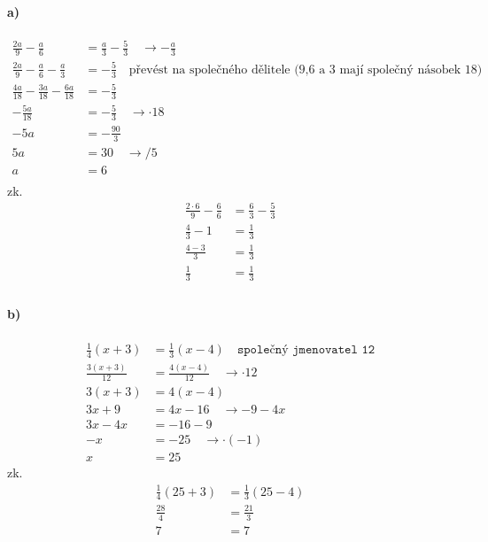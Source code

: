 \documentclass[12pt]{article}
\begin{document}
\paragraph{a)}
\begin{equation}
\begin{split}
\nonumber
\frac{2a}{9}-\frac{a}{6}&=\frac{a}{3}-\frac{5}{3}\quad \rightarrow -\frac{a}{3}\\
\frac{2a}{9}-\frac{a}{6}-\frac{a}{3}&=-\frac{5}{3}\quad \text{převést na společného dělitele (9,6 a 3 mají společný násobek 18)}\\
\frac{4a}{18}-\frac{3a}{18}-\frac{6a}{18}&=-\frac{5}{3}\\
-\frac{5a}{18}&=-\frac{5}{3}\quad \rightarrow \cdot 18\\
-5a&=-\frac{90}{3}\\
5a&=30 \quad \rightarrow /5\\
a&=6\\
\end{split}
\end{equation}
zk.
\begin{equation}
\begin{split}
\nonumber
\frac{2\cdot 6}{9}-\frac{6}{6}&=\frac{6}{3}-\frac{5}{3}\\
\frac{4}{3}-1&=\frac{1}{3}\\
\frac{4-3}{3}&=\frac{1}{3}\\
\frac{1}{3}&=\frac{1}{3}\\
\end{split}
\end{equation}

\paragraph{b)}
\begin{equation}
\begin{split}
\nonumber
\frac{1}{4}(x+3)&=\frac{1}{3}(x-4)\quad \texttt{společný jmenovatel 12}\\
\frac{3(x+3)}{12}&=\frac{4(x-4)}{12} \quad \rightarrow \cdot 12\\
3(x+3)&=4(x-4)\\
3x+9 &= 4x -16 \quad \rightarrow -9 - 4x\\
3x-4x &= -16 -9\\
-x&=-25\quad \rightarrow \cdot (-1)\\
x&=25
\end{split}
\end{equation}
zk.
\begin{equation}
\begin{split}
\nonumber
\frac{1}{4}(25+3)&=\frac{1}{3}(25-4)\\
\frac{28}{4}&=\frac{21}{3}\\
7&=7
\end{split}
\end{equation}
\end{document}

